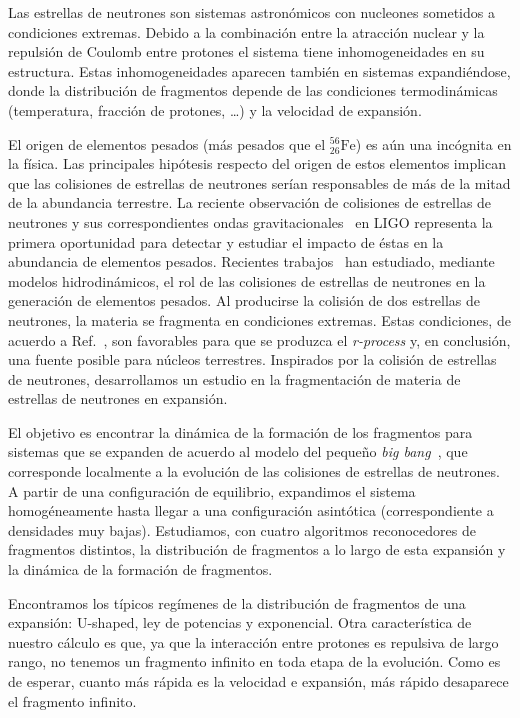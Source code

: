 Las estrellas de neutrones son sistemas astronómicos con nucleones sometidos a condiciones extremas.
Debido a la combinación entre la atracción nuclear y la repulsión de Coulomb entre protones el sistema tiene inhomogeneidades en su estructura.
Estas inhomogeneidades aparecen también en sistemas expandiéndose, donde la distribución de fragmentos depende de las condiciones termodinámicas (temperatura, fracción de protones, \ldots) y la velocidad de expansión.

El origen de elementos pesados (más pesados que el $^{56}_{26}\text{Fe}$) es aún una incógnita en la física.
Las principales hipótesis respecto del origen de estos elementos implican que las colisiones de estrellas de neutrones serían responsables de más de la mitad de la abundancia terrestre.
La reciente observación de colisiones de estrellas de neutrones y sus correspondientes ondas gravitacionales~\cite{ligo_scientific_collaboration_and_virgo_collaboration_gw170817:_2017} en LIGO representa la primera oportunidad para detectar y estudiar el impacto de éstas en la abundancia de elementos pesados.
Recientes trabajos~\cite{kasen_origin_2017} han estudiado, mediante modelos hidrodinámicos, el rol de las colisiones de estrellas de neutrones en la generación de elementos pesados.
Al producirse la colisión de dos estrellas de neutrones, la materia se fragmenta en condiciones extremas.
Estas condiciones, de acuerdo a Ref.~\cite{lattimer_black-hole-neutron-star_1974}, son favorables para que se produzca el \emph{r-process} y, en conclusión, una fuente posible para núcleos terrestres.
Inspirados por la colisión de estrellas de neutrones, desarrollamos un estudio en la fragmentación de materia de estrellas de neutrones en expansión.

El objetivo es encontrar la dinámica de la formación de los fragmentos para sistemas que se expanden de acuerdo al modelo del pequeño \emph{big bang}~\cite{dorso_onset_1996}, que corresponde localmente a la evolución de las colisiones de estrellas de neutrones.
A partir de una configuración de equilibrio, expandimos el sistema homogéneamente hasta llegar a una configuración asintótica (correspondiente a densidades muy bajas).
Estudiamos, con cuatro algoritmos reconocedores de fragmentos distintos, la distribución de fragmentos a lo largo de esta expansión y la dinámica de la formación de fragmentos.

Encontramos los típicos regímenes de la distribución de fragmentos de una expansión: U-shaped, ley de potencias y exponencial.
Otra característica de nuestro cálculo es que, ya que la interacción entre protones es repulsiva de largo rango, no tenemos un fragmento infinito en toda etapa de la evolución.
Como es de esperar, cuanto más rápida es la velocidad e expansión, más rápido desaparece el fragmento infinito.


